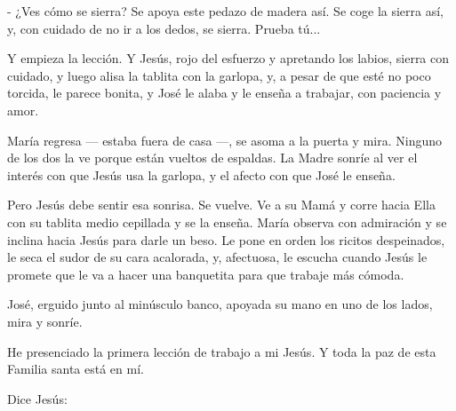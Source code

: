 \documentclass[12pt, twoside, openright]{book} %
\begin{document}
- ¿Ves cómo se sierra? Se apoya este pedazo de madera así. Se coge la sierra así, y, con cuidado de no ir a los dedos, se sierra. Prueba tú... 

Y empieza la lección. Y Jesús, rojo del esfuerzo y apretando los labios, sierra con cuidado, y luego alisa la tablita con la garlopa, y, a pesar de que esté no poco torcida, le parece bonita, y José le alaba y le enseña a trabajar, con paciencia y amor. 

María regresa — estaba fuera de casa —, se asoma a la puerta y mira. Ninguno de los dos la ve porque están vueltos de espaldas. La Madre sonríe al ver el interés con que Jesús usa la garlopa, y el afecto con que José le enseña. 

Pero Jesús debe sentir esa sonrisa. Se vuelve. Ve a su Mamá y corre hacia Ella con su tablita medio cepillada y se la enseña. María observa con admiración y se inclina hacia Jesús para darle un beso. Le pone en orden los ricitos despeinados, le seca el sudor de su cara acalorada, y, afectuosa, le escucha cuando Jesús le promete que le va a hacer una banquetita para que trabaje más cómoda. 

José, erguido junto al minúsculo banco, apoyada su mano en uno de los lados, mira y sonríe. 

He presenciado la primera lección de trabajo a mi Jesús. Y toda la paz de esta Familia santa está en mí. 

Dice Jesús: 
\end{document}
